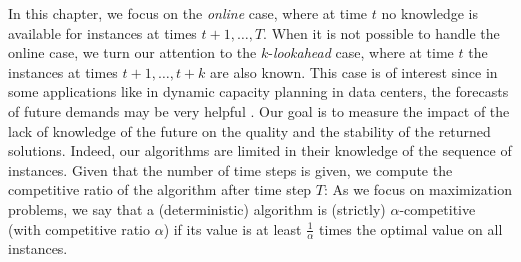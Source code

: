 \documentclass[a4paper]{book}
\newcommand{\finalversion}[1]{#1}
\begin{document}
 
 In this chapter, we focus on the \emph{online}  case, where at time $t$ no knowledge is available for instances at times $t+1, \ldots, T$.  When it is not possible to handle the online case, we turn our attention to the $k$-\emph{lookahead} case, where at time $t$ the instances at times $t+1, \ldots, t+k$ are also known. This case is of interest since in some applications like in  dynamic capacity planning in data centers,
 the forecasts of future demands may be very helpful  \cite{Lin,Liu}. Our goal is to measure the impact of the lack of  knowledge of the future  on the quality and the stability of the returned solutions. 
 Indeed, our algorithms are limited in their knowledge of the sequence of instances.
Given that the number of time steps is given, we compute the competitive ratio of the algorithm after time step $T$: As we focus on maximization problems, we say that a \finalversion{(deterministic)} algorithm is (strictly) $\alpha$-competitive (with competitive ratio $\alpha$) if its value is at least $\frac1\alpha$ times the optimal value on all instances.
\end{document}
